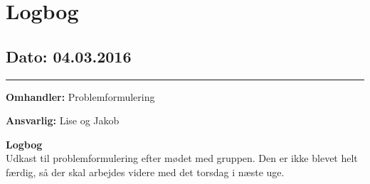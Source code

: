 \chapter{Logbog}

\section{Dato: 04.03.2016}
\hrule

\textbf{Omhandler:} Problemformulering

\textbf{Ansvarlig:} Lise og Jakob

\textbf{Logbog}
\\
Udkast til problemformulering efter mødet med gruppen. Den er ikke blevet helt færdig, så der skal arbejdes videre med det torsdag i næste uge.



